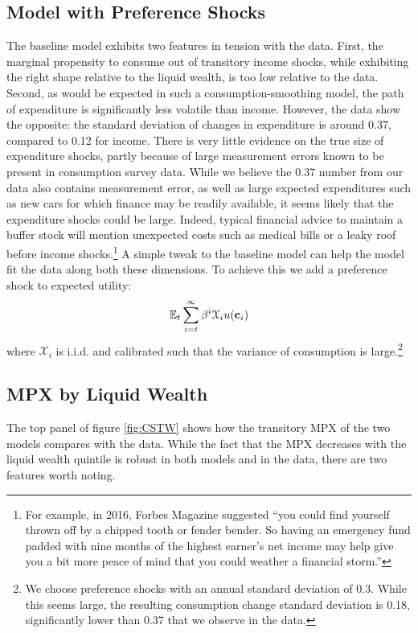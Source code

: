 \documentclass[titlepage]{\econtex}\newcommand{\texname}{ConsumptionHeterogeneity}
\begin{document}
\subsection{Model with Preference Shocks}
The baseline model exhibits two features in tension with the data. First, the marginal propensity to consume out of transitory income shocks, while exhibiting the right shape relative to the liquid wealth, is too low relative to the data. Second, as would be expected in such a consumption-smoothing model, the path of expenditure is significantly less volatile than income. However, the data show the opposite: the standard deviation of changes in expenditure is around 0.37, compared to 0.12 for income. There is very little evidence on the true size of expenditure shocks, partly because of large measurement errors known to be present in consumption survey data. While we believe the 0.37 number from our data also contains measurement error, as well as large expected expenditures such as new cars for which finance may be readily available, it seems likely that the expenditure shocks could be large. Indeed, typical financial advice to maintain a buffer stock will mention unexpected costs such as medical bills or a leaky roof before income shocks.\footnote{For example, in 2016,  Forbes Magazine suggested ``you could find yourself thrown off by a chipped tooth or fender bender. So having an emergency fund padded with nine months of the highest earner's net income may help give you a bit more peace of mind that you could weather a financial storm.''} A simple tweak to the baseline model can help the model fit the data along both these dimensions. To achieve this we add a preference shock to expected utility:
\begin{align*}
\mathbb{E}_t \sum_{i=t}^{\infty} \beta^i \mathcal{X}_i u(\mathbf{c}_i)
\end{align*}
where $\mathcal{X}_i$ is i.i.d. and calibrated such that the variance of consumption is large.\footnote{We choose preference shocks with an annual standard deviation of 0.3. While this seems large, the resulting consumption change standard deviation is 0.18, significantly lower than 0.37 that we observe in the data.}

\subsection{MPX by Liquid Wealth} 
The top panel of figure \ref{fig:CSTW} shows how the transitory MPX of the two models compares with the data. While the fact that the MPX decreases with the liquid wealth quintile is robust in both models and in the data, there are two features worth noting. 
\end{document}
